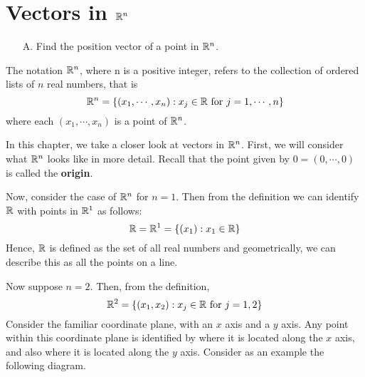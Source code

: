 \section{Vectors in $\mathbb{R}^n$}

\begin{outcome}

\begin{enumerate}
\item[A.] Find the position vector of a point in $\mathbb{R}^n$.
\end{enumerate}
\end{outcome}

The notation $\mathbb{R}^{n}$, where n is a positive integer, refers to the collection of ordered lists of 
$n$ real numbers, that is 
\[
\mathbb{R}^{n} = \{\left( x_{1},\cdots, x_{n}\right)
:x_{j}\in \mathbb{R}\mbox{ for }j=1,\cdots ,n\}
\]
where each $\left( x_{1},\cdots, x_{n}\right)$ is a point of $\mathbb{R}^n$.

In this chapter, we take a closer look at vectors in $\mathbb{R}^n$. First, we will consider what $\mathbb{R}^n$ looks like 
in more detail. Recall that the point given by $0=\left( 0, \cdots, 0 \right)$ is called the \textbf{origin}.

Now, consider the case of $\mathbb{R}^n$ for $n=1.$ Then from the definition we can identify 
$\mathbb{R}$ with points in $\mathbb{R}^{1}$ as follows:
\begin{equation*}
\mathbb{R} = \mathbb{R}^{1}=
 \{\left( x_{1}\right) :x_{1}\in \mathbb{R} \}
\end{equation*}
Hence, $\mathbb{R}$ is defined as the set of all real numbers and geometrically,
we can describe this as all the points on a line.

Now suppose $n=2$. Then, from the definition,
\begin{equation*}
\mathbb{R}^{2}=
\{\left(x_{1}, x_{2}\right)
:x_{j}\in \mathbb{R}\mbox{ for }j=1,2 \}
\end{equation*}
Consider the
familiar coordinate plane, with an $x$ axis and a $y$ axis. Any point
within this coordinate plane is identified by where it is located
along the $x$ axis, and also where it is located along the $y$
axis. Consider as an example the following diagram.

\begin{center}
\end{center}

